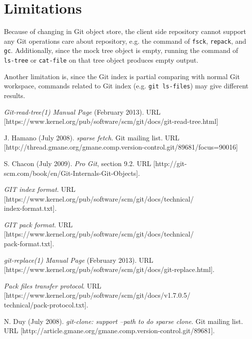 \documentclass[preprint]{sigplanconf}
\begin{document}
\section{Limitations}
Because of changing in Git object store, the client side repository cannot
support any Git operations care about repository, e.g. the command of
\verb|fsck|, \verb|repack|, and \verb|gc|.
Additionally, since the mock tree object is empty, running the command of
\verb|ls-tree| or \verb|cat-file| on that tree object produces empty output.

Another limitation is, since the Git index is partial comparing with normal Git
workspace, commands related to Git index (e.g. \verb|git ls-files|) may give
different results.

\begin{thebibliography}{10}
    \softraggedright

     \emph{Git-read-tree(1) Manual Page} (February 2013).
    \newblock URL
    [https://www.kernel.org/pub/software/scm/git/docs/git-read-tree.html]

     J. Hamano (July 2008).
    \newblock \emph{sparse fetch}.
    \newblock Git mailing list.
    \newblock URL
    [http://thread.gmane.org/gmane.comp.version-control.git/89681/focus=90016]

     S. Chacon (July 2009).
    \newblock\emph{Pro Git}, section 9.2.
    \newblock URL
    [http://git-scm.com/book/en/Git-Internals-Git-Objects].

     \emph{GIT index format}.
    \newblock URL
    [https://www.kernel.org/pub/software/scm/git/docs/technical/\\
    index-format.txt].

     \emph{GIT pack format}.
    \newblock URL
    [https://www.kernel.org/pub/software/scm/git/docs/technical/\\
    pack-format.txt].

     \emph{git-replace(1) Manual Page} (February 2013).
    \newblock URL
    [https://www.kernel.org/pub/software/scm/git/docs/git-replace.html].

     \emph{Pack files transfer protocol}.
    \newblock URL
    [https://www.kernel.org/pub/software/scm/git/docs/v1.7.0.5/\\
      technical/pack-protocol.txt].

    N. Duy (July 2008).
    \newblock \emph{git-clone: support --path to do sparse clone}.
    \newblock Git mailing list.
    \newblock URL
    [http://article.gmane.org/gmane.comp.version-control.git/89681].


\end{thebibliography}
\end{document}
